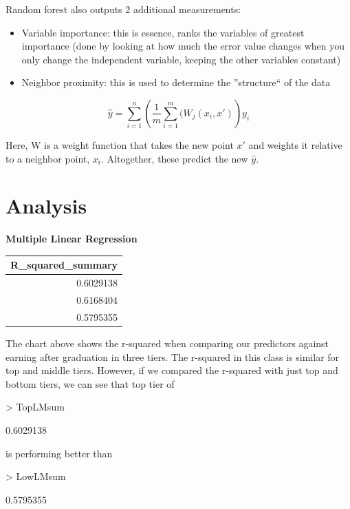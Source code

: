 \documentclass{article}
\begin{document}
Random forest also outputs 2 additional measurements:
\begin{itemize}
\item Variable importance: this is essence, ranks the variables of greatest importance (done by looking at how much the error value changes when you only change the independent variable, keeping the other variables constant)
\item Neighbor proximity: this is used to determine the ''structure`` of the data
\end{itemize}

$$\hat y =  \sum_{i=1}^{n} \left(\frac{1}{m} \sum_{i=1}^{m} (W_j(x_i,x')\right)y_i$$

Here, W is a weight function that takes the new point $x'$ and weights it relative to a neighbor point, $x_i$.  Altogether, these predict the new $\hat y$.



\section{Analysis}

\textbf{Multiple Linear Regression}\newline
\begin{table}[ht]
\centering
\begin{tabular}{r}
  \hline
R\_squared\_summary \\ 
  \hline
0.6029138 \\ 
  0.6168404 \\ 
  0.5795355 \\ 
   \hline
\end{tabular}
\end{table}\newline
  The chart above shows the r-squared when comparing our predictors against earning after graduation in three tiers. The r-squared in this class is similar for top and middle tiers.  However, if we compared the r-squared with just top and bottom tiers, we can see that top tier of 
\begin{Schunk}
\begin{Sinput}
> TopLMsum
\end{Sinput}
\begin{Soutput}
[1] 0.6029138
\end{Soutput}
\end{Schunk}
is performing better than 
\begin{Schunk}
\begin{Sinput}
> LowLMsum
\end{Sinput}
\begin{Soutput}
[1] 0.5795355
\end{Soutput}
\end{Schunk}
\end{document}
